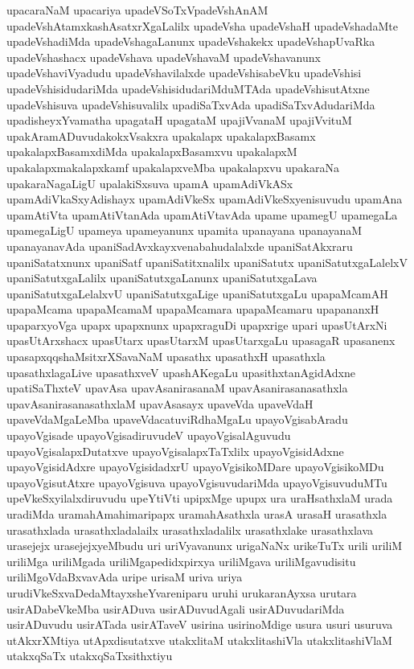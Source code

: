 {upacaraNaM
upacariya
upadeVSoTxVpadeVshAnAM
upadeVshAtamxkashAsatxrXgaLalilx
upadeVsha
upadeVshaH
upadeVshadaMte
upadeVshadiMda
upadeVshagaLanunx
upadeVshakekx
upadeVshapUvaRka
upadeVshashacx
upadeVshava
upadeVshavaM
upadeVshavanunx
upadeVshaviVyadudu
upadeVshavilalxde
upadeVshisabeVku
upadeVshisi
upadeVshisidudariMda
upadeVshisidudariMduMTAda
upadeVshisutAtxne
upadeVshisuva
upadeVshisuvalilx
upadiSaTxvAda
upadiSaTxvAdudariMda
upadisheyxYvamatha
upagataH
upagataM
upajiVvanaM
upajiVvituM
upakAramADuvudakokxVsakxra
upakalapx
upakalapxBasamx
upakalapxBasamxdiMda
upakalapxBasamxvu
upakalapxM
upakalapxmakalapxkamf
upakalapxveMba
upakalapxvu
upakaraNa
upakaraNagaLigU
upalakiSxsuva
upamA
upamAdiVkASx
upamAdiVkaSxyAdishayx
upamAdiVkeSx
upamAdiVkeSxyenisuvudu
upamAna
upamAtiVta
upamAtiVtanAda
upamAtiVtavAda
upame
upamegU
upamegaLa
upamegaLigU
upameya
upameyanunx
upamita
upanayana
upanayanaM
upanayanavAda
upaniSadAvxkayxvenabahudalalxde
upaniSatAkxraru
upaniSatatxnunx
upaniSatf
upaniSatitxnalilx
upaniSatutx
upaniSatutxgaLalelxV
upaniSatutxgaLalilx
upaniSatutxgaLanunx
upaniSatutxgaLava
upaniSatutxgaLelalxvU
upaniSatutxgaLige
upaniSatutxgaLu
upapaMcamAH
upapaMcama
upapaMcamaM
upapaMcamara
upapaMcamaru
upapananxH
upaparxyoVga
upapx
upapxnunx
upapxraguDi
upapxrige
upari
upasUtArxNi
upasUtArxshacx
upasUtarx
upasUtarxM
upasUtarxgaLu
upasagaR
upasanenx
upasapxqqshaMsitxrXSavaNaM
upasathx
upasathxH
upasathxla
upasathxlagaLive
upasathxveV
upashAKegaLu
upasithxtanAgidAdxne
upatiSaThxteV
upavAsa
upavAsanirasanaM
upavAsanirasanasathxla
upavAsanirasanasathxlaM
upavAsasayx
upaveVda
upaveVdaH
upaveVdaMgaLeMba
upaveVdacatuviRdhaMgaLu
upayoVgisabAradu
upayoVgisade
upayoVgisadiruvudeV
upayoVgisalAguvudu
upayoVgisalapxDutatxve
upayoVgisalapxTaTxlilx
upayoVgisidAdxne
upayoVgisidAdxre
upayoVgisidadxrU
upayoVgisikoMDare
upayoVgisikoMDu
upayoVgisutAtxre
upayoVgisuva
upayoVgisuvudariMda
upayoVgisuvuduMTu
upeVkeSxyilalxdiruvudu
upeYtiVti
upipxMge
upupx
ura
uraHsathxlaM
urada
uradiMda
uramahAmahimaripapx
uramahAsathxla
urasA
urasaH
urasathxla
urasathxlada
urasathxladalailx
urasathxladalilx
urasathxlake
urasathxlava
urasejejx
urasejejxyeMbudu
uri
uriVyavanunx
urigaNaNx
urikeTuTx
urili
uriliM
uriliMga
uriliMgada
uriliMgapedidxpirxya
uriliMgava
uriliMgavudisitu
uriliMgoVdaBxvavAda
uripe
urisaM
uriva
uriya
urudiVkeSxvaDedaMtayxsheYvareniparu
uruhi
urukaranAyxsa
urutara
usirADabeVkeMba
usirADuva
usirADuvudAgali
usirADuvudariMda
usirADuvudu
usirATada
usirATaveV
usirina
usirinoMdige
usura
usuri
usuruva
utAkxrXMtiya
utApxdisutatxve
utakxlitaM
utakxlitashiVla
utakxlitashiVlaM
utakxqSaTx
utakxqSaTxsithxtiyu
}
